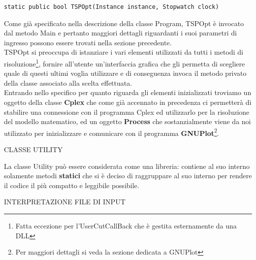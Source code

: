 \documentclass[11pt]{article}
\begin{document}
\begin{lstlisting}
static public bool TSPOpt(Instance instance, Stopwatch clock)
\end{lstlisting}

Come già specificato nella descrizione della classe Program, TSPOpt è invocato dal metodo Main e pertanto maggiori dettagli riguardanti i suoi parametri di ingresso possono essere trovati nella sezione precedente.\\
TSPOpt si preoccupa di istanziare i vari elementi utilizzati da tutti i metodi di risoluzione\footnote{Fatta eccezione per l'UserCutCallBack che è gestita esternamente da una DLL}, fornire all'utente un'interfaccia grafica che gli permetta di scegliere quale di questi ultimi voglia utilizzare e di conseguenza invoca il metodo privato della classe associato alla scelta effettuata.\\
Entrando nello specifico per quanto riguarda gli elementi inizializzati troviamo un oggetto della classe \textbf{Cplex} che come già accennato in precedenza ci permetterà di stabilire una connessione con il programma Cplex ed utilizzarlo per la risoluzione del modello matematico, ed un oggetto \textbf{Process} che sostanzialmente viene da noi utilizzato per inizializzare e comunicare con il programma \textbf{GNUPlot}\footnote{Per maggiori dettagli si veda la sezione dedicata a GNUPlot}.

\vspace{2\baselineskip}
CLASSE UTILITY
\vspace{2\baselineskip}

La classe Utility può essere considerata come una libreria: contiene al suo interno solamente metodi \textbf{statici} che si è deciso di raggruppare al suo interno per rendere il codice il più compatto e leggibile possibile.

\vspace{2\baselineskip}
INTERPRETAZIONE FILE DI INPUT
\vspace{2\baselineskip}
\end{document}
